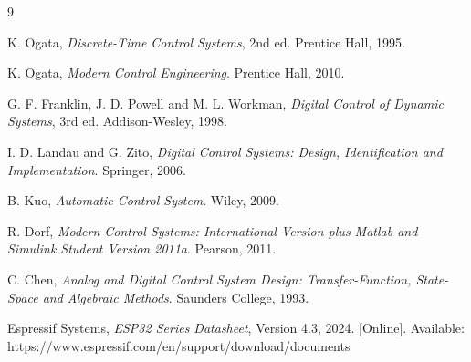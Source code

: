 \documentclass[conference]{IEEEtran}
\begin{document}
\begin{thebibliography}{9}

K. Ogata, \textit{Discrete-Time Control Systems}, 2nd ed. Prentice Hall, 1995.

K. Ogata, \textit{Modern Control Engineering}. Prentice Hall, 2010.

G. F. Franklin, J. D. Powell and M. L. Workman, \textit{Digital Control of
Dynamic Systems}, 3rd ed. Addison-Wesley, 1998.

I. D. Landau and G. Zito, \textit{Digital Control Systems: Design,
Identification and Implementation}. Springer, 2006.

B. Kuo, \textit{Automatic Control System}. Wiley, 2009.

R. Dorf, \textit{Modern Control Systems: International Version plus Matlab
and Simulink Student Version 2011a}. Pearson, 2011.

C. Chen, \textit{Analog and Digital Control System Design:
Transfer-Function, State-Space and Algebraic Methods}. Saunders College, 1993.

Espressif Systems, \textit{ESP32 Series Datasheet}, Version 4.3, 2024.
[Online]. Available: https://www.espressif.com/en/support/download/documents

\end{thebibliography}
\end{document}
